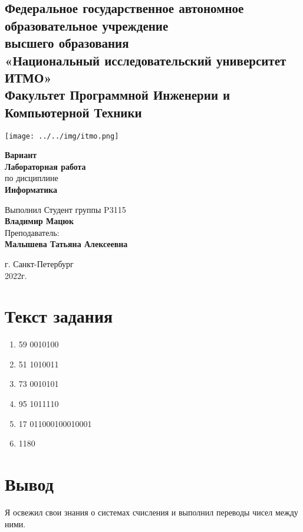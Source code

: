 \documentclass{article}
\begin{document}
\begin{center}
  \section*{
    Федеральное государственное автономное образовательное учреждение\\ высшего образования\\
    «Национальный исследовательский университет ИТМО»\\
    Факультет Программной Инженерии и Компьютерной Техники \\
   }
  \texttt{[image: ../../img/itmo.png]}
\end{center}
\vspace{4cm}


\begin{center}
  \large \textbf{Вариант }\\
  \textbf{Лабораторная работа }\\
  по дисциплине\\
  \textbf{Информатика}
\end{center}

\vspace*{\fill}

\begin{flushright}
  Выполнил Студент группы P3115\\
  \textbf{Владимир Мацюк}\\
  Преподаватель: \\
  \textbf{Малышева Татьяна Алексеевна}\\
\end{flushright}

\vspace{1cm}

\begin{center}
  г. Санкт-Петербург\\
  2022г.
\end{center}

\newpage


\section*{Текст задания}

\begin{enumerate}
  \item 59 0010100
  \item 51 1010011
  \item 73 0010101
  \item 95 1011110
  \item 17 011000100010001
  \item 1180
\end{enumerate}


\section*{Вывод}
Я освежил свои знания о системах счисления и выполнил переводы чисел между ними.
\end{document}

